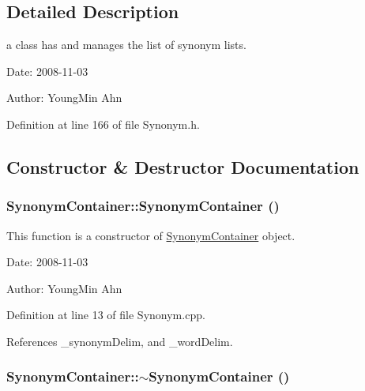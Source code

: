 \subsection{Detailed Description}
a class has and manages the list of synonym lists. 

\begin{Desc}
\item[Date:]2008-11-03 \end{Desc}
\begin{Desc}
\item[Author:]YoungMin Ahn \end{Desc}


Definition at line 166 of file Synonym.h.

\subsection{Constructor \& Destructor Documentation}
\hypertarget{classkmaOrange_1_1SynonymContainer_d093f6fd12aa4a2ce0e15f6ef481a65a}{
\subsubsection[{SynonymContainer}]{\setlength{\rightskip}{0pt plus 5cm}SynonymContainer::SynonymContainer ()}}
\label{classkmaOrange_1_1SynonymContainer_d093f6fd12aa4a2ce0e15f6ef481a65a}


This function is a constructor of \hyperlink{classkmaOrange_1_1SynonymContainer}{SynonymContainer} object. 

\begin{Desc}
\item[Date:]2008-11-03 \end{Desc}
\begin{Desc}
\item[Author:]YoungMin Ahn \end{Desc}


Definition at line 13 of file Synonym.cpp.

References \_\-synonymDelim, and \_\-wordDelim.\hypertarget{classkmaOrange_1_1SynonymContainer_f65be98a8ceaad2fc15d556721b79518}{
\subsubsection[{$\sim$SynonymContainer}]{\setlength{\rightskip}{0pt plus 5cm}SynonymContainer::$\sim$SynonymContainer ()}}
\label{classkmaOrange_1_1SynonymContainer_f65be98a8ceaad2fc15d556721b79518}


